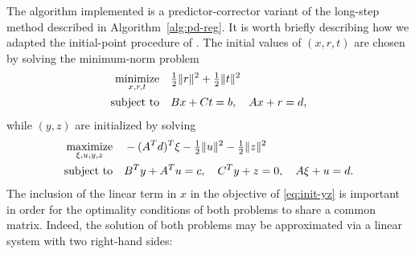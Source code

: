 \documentclass{amsart}
\begin{document}
The algorithm implemented is a predictor-corrector variant of the long-step
method described in Algorithm~\ref{alg:pd-reg}. It is worth briefly describing
how we adapted the initial-point procedure of \cite{mehrotra-1992}. The initial
values of $(x,r,t)$ are chosen by solving the minimum-norm problem
\begin{equation}
  \label{eq:init-xrt}
  \begin{aligned}
    \displaystyle\mathop{\textup{minimize}}_{x, r, t} \quad & \tfrac{1}{2} \|r\|^2 + \tfrac{1}{2} \|t\|^2 \\
    \mathop{\textup{subject to}} \quad & Bx + Ct = b, \quad Ax + r = d,
  \end{aligned}
\end{equation}
while $(y,z)$ are initialized by solving
\begin{equation}
  \label{eq:init-yz}
  \begin{aligned}
    \displaystyle\mathop{\textup{maximize}}_{\xi, u, y, z} \quad &
      - (A^T d)^T \xi - \tfrac{1}{2} \|u\|^2 - \tfrac{1}{2} \|z\|^2 \\
    \mathop{\textup{subject to}} \quad & B^T y + A^T u = c, \quad
                C^T y + z = 0, \quad
                A \xi + u = d.
  \end{aligned}
\end{equation}
The inclusion of the linear term in $x$ in the objective of \eqref{eq:init-yz}
is important in order for the optimality conditions of both problems to share
a common  matrix. Indeed, the solution of both problems may be
approximated via a linear system with two right-hand sides:
\end{document}
